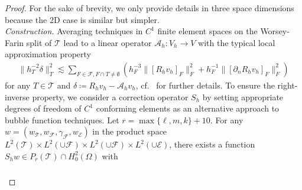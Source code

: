 \documentclass[a4paper]{amsart}
\numberwithin{equation}{section}
\def\F{\mathcal{F}}
\def\E{\mathcal{E}}
\def\T{\mathcal{T}}
\newcommand\ds{\,\text{d}s}
\newcommand\dt{\,\text{d}t}
\newcommand\dx{\,\text{d}x}
\theoremstyle{definition}
\theoremstyle{remark}
\numberwithin{theorem}{section}
\numberwithin{equation}{section}
\numberwithin{table}{section}
\numberwithin{figure}{section}
\begin{document}
\begin{proof}
For the sake of brevity, we only provide details in three space dimensions because the 2D case is similar but simpler.\\[-0.5em] 

\noindent\emph{Construction.} Averaging techniques in $C^1$ finite element spaces on the Worsey-Farin split of $\T$ \cite{WorseyFarin1987,GuzmanLischkeNeilan2022} lead to a linear operator $\mathcal{A}_h : V_h \to V$ with
the typical local approximation property
\begin{align}\label{ineq:appr-averaging}
    \|h_T^{-2} \delta\|^2_T
    \lesssim \sum_{F \in \F, F \cap T \neq \emptyset} (h_F^{-3} \|[R_h v_h]_F\|^2_F + h_F^{-1} \|[\partial_nR_h v_h]_F\|^2_F)
\end{align}
for any $T \in \T$ and $\delta \coloneqq R_h v_h - \mathcal{A}_h v_h$, cf.~\cite{GallistlTian2024} for further details.
To ensure the right-inverse property, we consider a correction operator $S_h$
by setting appropriate degrees of freedom of $C^1$ conforming elements as an alternative approach to bubble function techniques.
Let $r = \max\{\ell,m,k\} + 10$.
For any $w=(w_{\mathcal{T}}, w_{\mathcal{F}}, \gamma_{\F}, w_\E)$ in the product space $L^2(\T) \times L^2(\cup\F) \times L^2(\cup\F) \times L^2(\cup \E)$, there exists a function $S_h w \in P_r(\T) \cap H^2_0(\Omega)$ with
\begin{align}\label{def:correction}
    \begin{aligned}

\end{aligned}
\end{align}
\end{proof}
\end{document}
